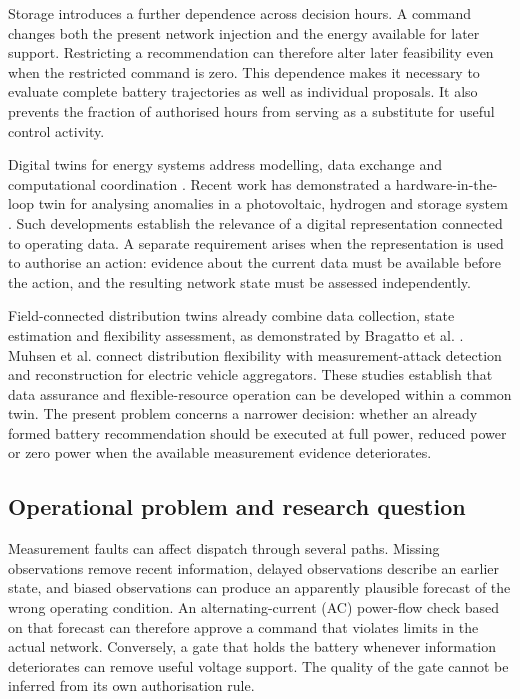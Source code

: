 \documentclass[preprint,12pt]{elsarticle}
\begin{document}
Storage introduces a further dependence across decision hours. A command changes both the present network injection and the energy available for later support. Restricting a recommendation can therefore alter later feasibility even when the restricted command is zero. This dependence makes it necessary to evaluate complete battery trajectories as well as individual proposals. It also prevents the fraction of authorised hours from serving as a substitute for useful control activity.


Digital twins for energy systems address modelling, data exchange and computational coordination \cite{ardebili}. Recent work has demonstrated a hardware-in-the-loop twin for analysing anomalies in a photovoltaic, hydrogen and storage system \cite{hueros}. Such developments establish the relevance of a digital representation connected to operating data. A separate requirement arises when the representation is used to authorise an action: evidence about the current data must be available before the action, and the resulting network state must be assessed independently.

Field-connected distribution twins already combine data collection, state estimation and flexibility assessment, as demonstrated by Bragatto et al. \cite{bragatto}. Muhsen et al. \cite{muhsen} connect distribution flexibility with measurement-attack detection and reconstruction for electric vehicle aggregators. These studies establish that data assurance and flexible-resource operation can be developed within a common twin. The present problem concerns a narrower decision: whether an already formed battery recommendation should be executed at full power, reduced power or zero power when the available measurement evidence deteriorates.


\subsection{Operational problem and research question}
Measurement faults can affect dispatch through several paths. Missing observations remove recent information, delayed observations describe an earlier state, and biased observations can produce an apparently plausible forecast of the wrong operating condition. An alternating-current (AC) power-flow check based on that forecast can therefore approve a command that violates limits in the actual network. Conversely, a gate that holds the battery whenever information deteriorates can remove useful voltage support. The quality of the gate cannot be inferred from its own authorisation rule.
\end{document}
